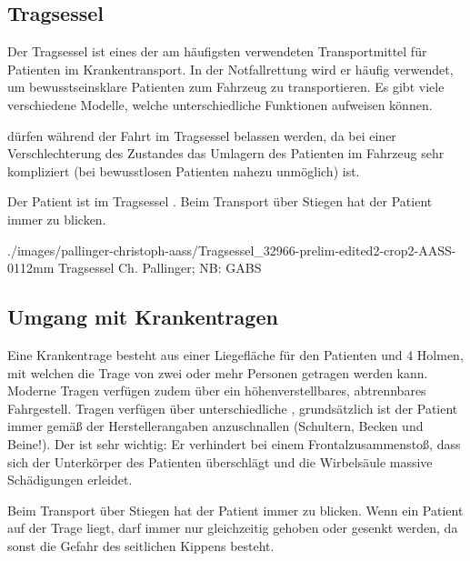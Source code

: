 \clearpage
\subsection{Tragsessel}

{\label{topic:tragsessel}%
Der Tragsessel ist eines der am häufigsten verwendeten
Transportmittel für Patienten im Krankentransport. In der
Notfallrettung wird er häufig verwendet, um
bewusstseinsklare Patienten zum Fahrzeug zu
transportieren. Es gibt viele verschiedene Modelle, welche
unterschiedliche Funktionen aufweisen können.

 dürfen  während der Fahrt im Tragsessel belassen
werden, da bei einer Verschlechterung des Zustandes das
Umlagern des Patienten im Fahrzeug sehr kompliziert (bei
bewusstlosen Patienten nahezu unmöglich) ist. 

Der Patient ist im Tragsessel . Beim
Transport über Stiegen hat der Patient immer  zu blicken.
}{

}
{./images/pallinger-christoph-aass/Tragsessel_32966-prelim-edited2-crop2-AASS-0112mm}
{Tragsessel}
{Ch. Pallinger; NB: GABS}




\subsection{Umgang mit Krankentragen}
\label{topic:fahrtrage}

{%
%
%
%
%
%
%
Eine Krankentrage besteht aus einer Liegefläche für den
Patienten und 4 Holmen, mit welchen die Trage von zwei oder
mehr Personen getragen werden kann. Moderne Tragen verfügen
zudem über ein höhenverstellbares, abtrennbares Fahrgestell. 
Tragen verfügen über unterschiedliche ,
grundsätzlich ist der Patient immer gemäß der
Herstellerangaben anzuschnallen (Schultern, Becken und
Beine!). Der  ist sehr wichtig: Er verhindert
bei einem Frontalzusammenstoß, dass sich der Unterkörper des
Patienten überschlägt und die Wirbelsäule massive
Schädigungen erleidet.

Beim Transport über Stiegen hat der Patient immer
 zu blicken.
Wenn ein Patient auf der Trage liegt, darf immer nur
 gleichzeitig gehoben oder gesenkt werden,
da sonst die Gefahr des seitlichen Kippens besteht.


}{

}
{}
{}
{}
% 
% 

